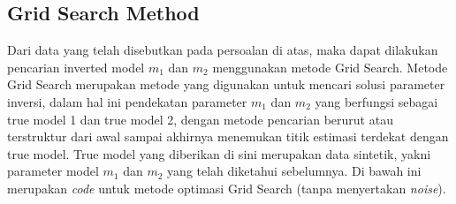 \documentclass{article}
\begin{document}
\subsection{Grid Search Method}
Dari data yang telah disebutkan pada persoalan di atas, maka dapat dilakukan pencarian inverted model $m_1$ dan $m_2$ menggunakan metode Grid Search.
Metode Grid Search merupakan metode yang digunakan untuk mencari solusi parameter inversi, dalam hal ini pendekatan parameter $m_1$ dan $m_2$ yang berfungsi sebagai true model 1 dan true model 2, dengan metode pencarian berurut atau terstruktur dari awal sampai akhirnya menemukan titik estimasi terdekat dengan true model.
True model yang diberikan di sini merupakan data sintetik, yakni parameter model $m_1$ dan $m_2$ yang telah diketahui sebelumnya.
Di bawah ini merupakan \textit{code} untuk metode optimasi Grid Search (tanpa menyertakan \textit{noise}).
\end{document}

